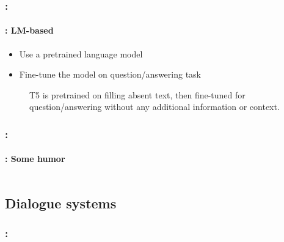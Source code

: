 \documentclass[xcolor=table]{beamer}
\begin{document}
\begin{frame}
	\frametitle{\insertshortsubtitle: \insertsection}
	\framesubtitle{\insertsubsection: LM-based}
	
	\begin{itemize}
		\item Use a pretrained language model
		\item Fine-tune the model on question/answering task
	\end{itemize}

	\begin{figure}
		\centering
		\caption{T5 is pretrained on filling absent text, then fine-tuned for question/answering without any additional information or context. \cite{2020-roberts-al}}
	\end{figure}
	
\end{frame}

\begin{frame}
	\frametitle{\insertshortsubtitle: \insertsection}
	\framesubtitle{\insertsubsection: Some humor}
	
	\begin{columns}
		\begin{column}{0.3\textwidth}
			
		\end{column}
		\begin{column}{0.4\textwidth}
		\end{column}
	\end{columns}

\end{frame}

\subsection{Dialogue systems}

\begin{frame}
	\frametitle{\insertshortsubtitle: \insertsection}
	\framesubtitle{\insertsubsection}
	
	
\end{frame}
\end{document}

